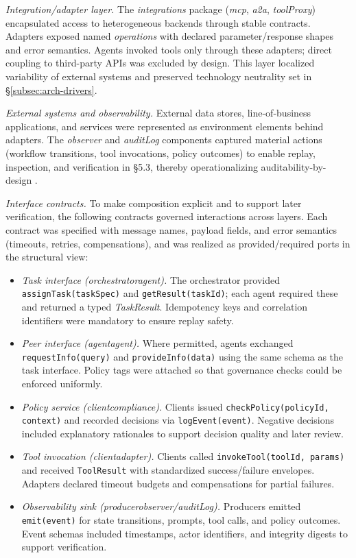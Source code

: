 \emph{Integration/adapter layer.} The \emph{integrations} package (\emph{mcp}, \emph{a2a}, \emph{toolProxy}) encapsulated access to heterogeneous backends through stable contracts. Adapters exposed named \emph{operations} with declared parameter/response shapes and error semantics. Agents invoked tools only through these adapters; direct coupling to third-party APIs was excluded by design. This layer localized variability of external systems and preserved technology neutrality set in §\ref{subsec:arch-drivers}.

\emph{External systems and observability.} External data stores, line-of-business applications, and services were represented as environment elements behind adapters. The \emph{observer} and \emph{auditLog} components captured material actions (workflow transitions, tool invocations, policy outcomes) to enable replay, inspection, and verification in §5.3, thereby operationalizing auditability-by-design \parencite{IEEEStandard1990}.

\emph{Interface contracts.} To make composition explicit and to support later verification, the following contracts governed interactions across layers. Each contract was specified with message names, payload fields, and error semantics (timeouts, retries, compensations), and was realized as provided/required ports in the structural view:
\begin{itemize}
  \item \emph{Task interface (orchestrator\textendash agent).} The orchestrator provided \texttt{assignTask(taskSpec)} and \texttt{getResult(taskId)}; each agent required these and returned a typed \emph{TaskResult}. Idempotency keys and correlation identifiers were mandatory to ensure replay safety.
  \item \emph{Peer interface (agent\textendash agent).} Where permitted, agents exchanged \texttt{requestInfo(query)} and \texttt{provideInfo(data)} using the same schema as the task interface. Policy tags were attached so that governance checks could be enforced uniformly.
  \item \emph{Policy service (client\textendash compliance).} Clients issued \texttt{checkPolicy(policyId, context)} and recorded decisions via \texttt{logEvent(event)}. Negative decisions included explanatory rationales to support decision quality and later review.
  \item \emph{Tool invocation (client\textendash adapter).} Clients called \texttt{invokeTool(toolId, params)} and received \texttt{ToolResult} with standardized success/failure envelopes. Adapters declared timeout budgets and compensations for partial failures.
  \item \emph{Observability sink (producer\textendash observer/auditLog).} Producers emitted \texttt{emit(event)} for state transitions, prompts, tool calls, and policy outcomes. Event schemas included timestamps, actor identifiers, and integrity digests to support verification.
\end{itemize}

